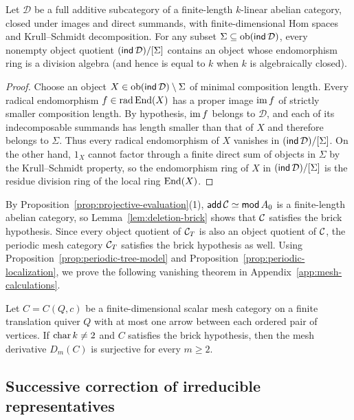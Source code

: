\begin{lemma}
\label{lem:deletion-brick}
Let $\mathcal D$ be a full additive subcategory of a finite-length
$k$-linear abelian category, closed under images and direct summands, with
finite-dimensional Hom spaces and Krull--Schmidt decomposition. For any subset
$\Sigma\subseteq\operatorname{ob}(\operatorname{\mathsf{ind}}\mathcal D)$, every nonempty object
quotient $(\operatorname{\mathsf{ind}}\mathcal D)/[\Sigma]$ contains an object whose endomorphism
ring is a division algebra (and hence is equal to $k$ when $k$ is
algebraically closed).
\end{lemma}
\begin{proof}
Choose an object $X\in\operatorname{ob}(\operatorname{\mathsf{ind}}\mathcal D)\setminus\Sigma$ of
minimal composition length. Every radical endomorphism $f\in\operatorname{rad}\operatorname{End}(X)$ has
a proper image $\operatorname{im} f$ of strictly smaller composition length. By hypothesis,
$\operatorname{im} f$ belongs to $\mathcal D$, and each of its indecomposable summands has
length smaller than that of $X$ and therefore belongs to $\Sigma$. Thus every
radical endomorphism of $X$ vanishes in $(\operatorname{\mathsf{ind}}\mathcal D)/[\Sigma]$. On the
other hand, $1_X$ cannot factor through a finite direct sum of objects in
$\Sigma$ by the Krull--Schmidt property, so the endomorphism ring of $X$ in
$(\operatorname{\mathsf{ind}}\mathcal D)/[\Sigma]$ is the residue division ring of the local ring
$\operatorname{End}(X)$.
\end{proof}

By Proposition~\ref{prop:projective-evaluation}(1), $\operatorname{\mathsf{add}}\mathcal C\simeq\operatorname{\mathsf{mod}} A_0$
is a finite-length abelian category, so Lemma~\ref{lem:deletion-brick} shows
that $\mathcal C$ satisfies the brick hypothesis. Since every object quotient of
$\mathcal C_T$ is also an object quotient of $\mathcal C$, the periodic mesh category $\mathcal C_T$
satisfies the brick hypothesis as well. Using Proposition~\ref{prop:periodic-tree-model}
and Proposition~\ref{prop:periodic-localization}, we prove the following
vanishing theorem in Appendix~\ref{app:mesh-calculations}.

\begin{proposition}
\label{prop:mesh-correction-spaces}
Let $C=C(Q,c)$ be a finite-dimensional scalar mesh category on a finite
translation quiver $Q$ with at most one arrow between each ordered pair of
vertices. If $\operatorname{char} k\ne2$ and $C$ satisfies the brick hypothesis, then the
mesh derivative $D_m(C)$ is surjective for every $m\geq2$.
\end{proposition}

\subsection{Successive correction of irreducible representatives}
\label{subsec:successive-correction}

